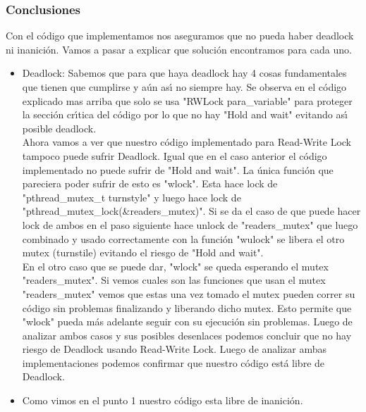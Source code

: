 \subsubsection{Conclusiones}

Con el c\'{o}digo que implementamos nos aseguramos que no pueda haber deadlock ni inanici\'{o}n. Vamos a pasar a explicar que 
soluci\'{o}n encontramos para cada uno. \\

\begin{itemize}
 \item Deadlock: Sabemos que para que haya deadlock hay 4 cosas fundamentales que tienen que cumplirse y a\'{u}n as\'{\i} no 
 siempre hay. Se observa en el c\'{o}digo explicado mas arriba que solo se usa "RWLock para\_variable" para proteger la secci\'{o}n 
 cr\'{\i}tica del c\'{o}digo por lo que no hay "Hold and wait" evitando as\'{\i} posible deadlock.\\
 Ahora vamos a ver que nuestro c\'{o}digo implementado para Read-Write Lock tampoco puede sufrir Deadlock. Igual que en el caso 
 anterior el c\'{o}digo implementado no puede sufrir de "Hold and wait". La \'{u}nica funci\'{o}n que pareciera poder sufrir de 
 esto es "wlock". Esta hace lock de "pthread\_mutex\_t turnstyle" y luego hace lock de "pthread\_mutex\_lock(\&readers\_mutex)". Si se 
 da el caso de que puede hacer lock de ambos en el paso siguiente hace unlock de "readers\_mutex" que luego combinado y usado 
 correctamente con la funci\'{o}n "wulock" se libera el otro mutex (turnstile) evitando el riesgo de "Hold and wait". \\
 En el otro caso que se puede dar, "wlock" se queda esperando el mutex "readers\_mutex". Si vemos cuales son las funciones que 
 usan el mutex "readers\_mutex" vemos que estas una vez tomado el mutex pueden correr su c\'{o}digo sin problemas finalizando 
 y liberando dicho mutex. Esto permite que "wlock" pueda m\'{a}s adelante seguir con su ejecuci\'{o}n sin problemas. Luego de 
 analizar ambos casos y sus posibles desenlaces podemos concluir que no hay riesgo de Deadlock usando Read-Write Lock. Luego de 
 analizar ambas implementaciones podemos confirmar que nuestro c\'{o}digo est\'{a} libre de Deadlock.
 \item Como vimos en el punto 1 nuestro c\'{o}digo esta libre de inanici\'{o}n.
 \end{itemize}